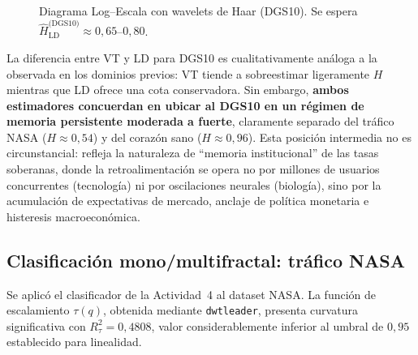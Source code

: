 \begin{figure}[H]
    \centering
    \begin{minipage}[t]{0.48\textwidth}
        \centering
        \caption{Diagrama Varianza--Tiempo (DGS10). Se espera pendiente
                 $\hat{H}_{\text{VT}}^{\text{(DGS10)}} \approx 0{,}70$--$0{,}85$.}
        \label{fig:a6-dgs10-vt}
    \end{minipage}
    \hfill
    \begin{minipage}[t]{0.48\textwidth}
        \centering
        \caption{Diagrama Log--Escala con wavelets de Haar (DGS10).
                 Se espera $\hat{H}_{\text{LD}}^{\text{(DGS10)}} \approx 0{,}65$--$0{,}80$.}
        \label{fig:a6-dgs10-ld}
    \end{minipage}
\end{figure}

La diferencia entre VT y LD para DGS10 es cualitativamente análoga a la
observada en los dominios previos: VT tiende a sobreestimar ligeramente $H$
mientras que LD ofrece una cota conservadora. Sin embargo, \textbf{ambos
estimadores concuerdan en ubicar al DGS10 en un régimen de memoria persistente
moderada a fuerte}, claramente separado del tráfico NASA ($H\approx0{,}54$) y
del corazón sano ($H\approx0{,}96$). Esta posición intermedia no es
circunstancial: refleja la naturaleza de ``memoria institucional'' de las tasas
soberanas, donde la retroalimentación se opera no por millones de usuarios
concurrentes (tecnología) ni por oscilaciones neurales (biología), sino por la
acumulación de expectativas de mercado, anclaje de política monetaria e
histeresis macroeconómica.

\subsection{Clasificación mono/multifractal: tráfico NASA}

Se aplicó el clasificador de la Actividad~4 al dataset NASA. La función de
escalamiento $\tau(q)$, obtenida mediante \texttt{dwtleader}, presenta curvatura
significativa con $R^2_{\tau} = 0{,}4808$, valor considerablemente inferior al
umbral de $0{,}95$ establecido para linealidad.

